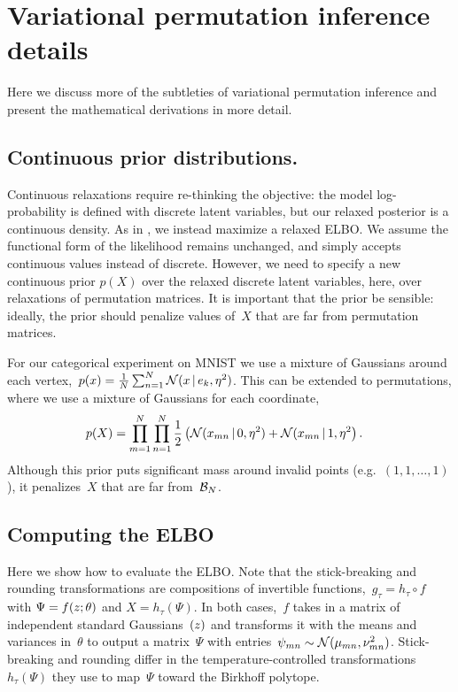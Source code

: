 \section{Variational permutation inference details}
\label{sec:details}

Here we discuss more of the subtleties of variational permutation
inference and present the mathematical derivations in more detail. 

\subsection{Continuous prior distributions.} 
Continuous relaxations require re-thinking the objective: the model
log-probability is defined with discrete latent variables, but our
relaxed posterior is a continuous density. As in
\cite{maddison2016concrete}, we instead maximize a relaxed ELBO.  We
assume the functional form of the likelihood remains unchanged, and
simply accepts continuous values instead of discrete. However, we need
to specify a new continuous prior $p(X)$ over the relaxed discrete
latent variables, here, over relaxations of permutation matrices. It
is important that the prior be sensible: ideally, the prior should
penalize values of~$X$ that are far from permutation matrices.

For our categorical experiment on MNIST we use a mixture of Gaussians
around each
vertex,~${p(x) = \tfrac{1}{N} \sum_{n=1}^N \mathcal{N}(x \, | \, e_k,
  \eta^2)}$.  This can be extended to permutations, where we use a
mixture of Gaussians for each coordinate,
\begin{align}
\label{eq:permprior}
  p(X) &= \prod_{m=1}^N \prod_{n=1}^N
  \frac{1}{2} \left(\mathcal{N}(x_{mn} \, | \, 0, \eta^2) + \mathcal{N}(x_{mn} \, | \, 1, \eta^2 \right).
\end{align}
Although this prior puts significant mass around invalid points
(e.g.~${(1, 1, \ldots, 1)}$), it penalizes~$X$ that are far from~$\mathcal{B}_N$.

\subsection{Computing the ELBO}
Here we show how to evaluate the ELBO.  Note that the stick-breaking
and rounding transformations are compositions of invertible
functions,~${g_\tau = h_\tau \circ f}$ with ${\Psi = f(z; \theta)}$ and
${X = h_\tau(\Psi)}$.  In both cases,~$f$ takes in a matrix of
independent standard Gaussians~$(z)$ and transforms it with the
means and variances in~$\theta$ to output a matrix~$\Psi$ with
entries~${\psi_{mn} \sim \mathcal{N}(\mu_{mn}, \nu^2_{mn})}$.
Stick-breaking and rounding differ in the temperature-controlled
transformations~$h_\tau(\Psi)$ they use to map~$\Psi$ toward the
Birkhoff polytope.

